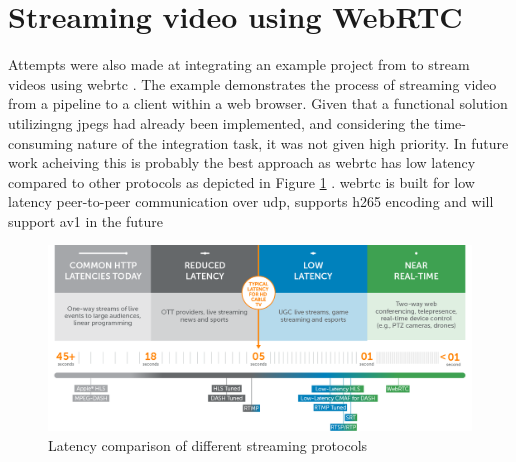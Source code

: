 \section{Streaming video using WebRTC}
Attempts were also made at integrating an example project from \gs  to stream videos using \gls{webrtc} \cite{gstreamerWebrtcMasterGStreamer2021}.
The example demonstrates the process of streaming video from a pipeline to a client within a web browser.
Given that a functional solution utilizingng \glspl{jpeg} had already been implemented, and considering the time-consuming nature of the integration task, it was not given high priority.
In future work acheiving this is probably the best approach as \gls{webrtc} has low latency compared to other protocols as depicted in Figure \ref{fig:streaming_latency} \cite{doughertyUltraLowLatency2022}.
\gls{webrtc} is built for low latency peer-to-peer communication over \gls{udp}, supports \gls{h265} encoding and will support \gls{av1} in the future \cite[1]{loretoRealTimeCommunicationWebRTC2014} \cite{ablyWebRTCVsWebSocket2023} \cite{mekyaFirstHEVC2652020}
\cite{red5proKeyReasonsAV12023}
\begin{figure}[H]
    \centering
    \includegraphics[width=\textwidth]{figures/webrtc_latency.png}
    \caption{Latency comparison of different streaming protocols \cite{doughertyUltraLowLatency2022}}
    \label{fig:streaming_latency}
\end{figure}